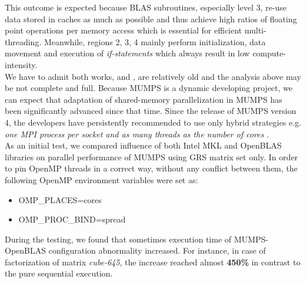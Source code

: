 This outcome is expected because BLAS subroutines, especially level 3, re-use data stored in caches as much as possible and thus achieve high ratios of floating point operations per memory access which is essential for efficient multi-threading. Meanwhile, regions 2, 3, 4 mainly perform initialization, data movement and execution of \textit{if-statements} which always result in low compute-intensity.\\



We have to admit both works, \cite{chowdhury2010some} and \cite{l2013introduction}, are relatively old and the analysis above may be not complete and full. Because MUMPS is a dynamic developing project, we can expect that adaptation of shared-memory parallelization in MUMPS has been significantly advanced since that time. Since the release of MUMPS version 4, the developers have persistently recommended to use only hybrid strategies e.g. \textit{one MPI process per socket and as many threads as the number of cores} \cite{mumps-manual}.\\


As an initial test, we compared influence of both Intel MKL and OpenBLAS libraries on parallel performance of MUMPS using GRS matrix set only. In order to pin OpenMP threads in a correct way, without any conflict between them, the following OpenMP environment variables were set as:

\begin{itemize}
	\item OMP\_PLACES=cores
	\item OMP\_PROC\_BIND=spread
\end{itemize} 


During the testing, we found that sometimes execution time of MUMPS-OpenBLAS configuration abnormality increased. For instance, in case of factorization of matrix \textit{cube-645}, the increase reached almost \textbf{450\%} in contrast to the pure sequential execution. \\

